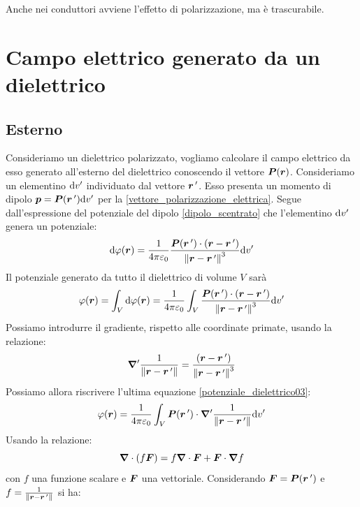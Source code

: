 Anche nei conduttori avviene l'effetto di polarizzazione, ma è trascurabile.

\section{Campo elettrico generato da un dielettrico}
\subsection{Esterno}
Consideriamo un dielettrico polarizzato, vogliamo calcolare il campo elettrico da esso generato all'esterno del dielettrico conoscendo il vettore $\boldsymbol{P}(\boldsymbol{r})$. Consideriamo un elementino $\mathrm{d} v'$ individuato dal vettore $\boldsymbol{r}\,'$. Esso presenta un momento di dipolo $\boldsymbol{p}=\boldsymbol{P}(\boldsymbol{r}\,')\mathrm{d} v'$ per la \eqref{vettore_polarizzazione_elettrica}. Segue dall'espressione del potenziale del dipolo \eqref{dipolo_scentrato} che l'elementino $\mathrm{d} v'$ genera un potenziale:
\begin{equation}
\mathrm{d}\varphi(\boldsymbol{r})=\frac{1}{4\pi\varepsilon_0}\frac{\boldsymbol{P}(\boldsymbol{r}\,')\cdot\left(\boldsymbol{r}-\boldsymbol{r}\,'\right)}{\left\lVert\boldsymbol{r}-\boldsymbol{r}\,'\right\rVert^3}\mathrm{d} v'
\end{equation}
Il potenziale generato da tutto il dielettrico di volume $V$ sarà 
\begin{equation}
\varphi(\boldsymbol{r})=\int_V\mathrm{d}\varphi(\boldsymbol{r})=\frac{1}{4\pi\varepsilon_0}\int_V\frac{\boldsymbol{P}(\boldsymbol{r}\,')\cdot\left(\boldsymbol{r}-\boldsymbol{r}\,'\right)}{\left\lVert\boldsymbol{r}-\boldsymbol{r}\,'\right\rVert^3}\mathrm{d} v'
\label{potenziale_dielettrico03}
\end{equation}
Possiamo introdurre il gradiente, rispetto alle coordinate primate, usando la relazione:
\begin{equation}
\boldsymbol{\nabla}'\frac{1}{\left\lVert\boldsymbol{r}-\boldsymbol{r}\,'\right\rVert}=\frac{\left(\boldsymbol{r}-\boldsymbol{r}\,'\right)}{\left\lVert\boldsymbol{r}-\boldsymbol{r}\,'\right\rVert^3}
\end{equation}
Possiamo allora riscrivere l'ultima equazione \eqref{potenziale_dielettrico03}:
\begin{equation}
\varphi(\boldsymbol{r})=\frac{1}{4\pi\varepsilon_0}\int_V\boldsymbol{P}(\boldsymbol{r}\,')\cdot\boldsymbol{\nabla}'\frac{1}{\left\lVert\boldsymbol{r}-\boldsymbol{r}\,'\right\rVert}\mathrm{d} v'
\label{potenziale_dielettrico04}
\end{equation}
Usando la relazione:
\begin{equation}
\boldsymbol{\nabla}\cdot(f\boldsymbol{F})=f\boldsymbol{\nabla}\cdot\boldsymbol{F}+\boldsymbol{F}\cdot\boldsymbol{\nabla} f
\end{equation}
con $f$ una funzione scalare e $\boldsymbol{F}$ una vettoriale. Considerando $\boldsymbol{F}=\boldsymbol{P}(\boldsymbol{r}\,')$ e $f=\frac{1}{\left\lVert\boldsymbol{r}-\boldsymbol{r}\,'\right\rVert}$ si ha:
